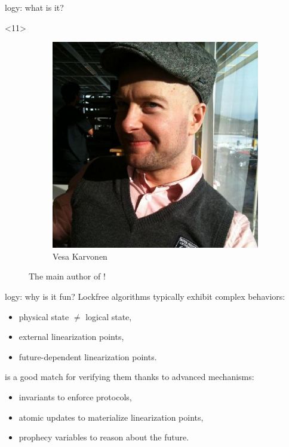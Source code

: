\begin{frame}[fragile]{\Zoo[]logy: what is it?}
\begin{overbox}<11>
    \begin{figure}
        \begin{subfigure}{0.4\textwidth}
            \includegraphics[scale=0.2]{images/vesa_karvonen.jpg}
            \caption*{\footnotesize Vesa Karvonen}
        \end{subfigure}
        \caption*{The main author of \Kcas!}
    \end{figure}
\end{overbox}


\end{frame}


\begin{frame}{\Zoo[]logy: why is it fun?}
Lockfree algorithms typically exhibit complex behaviors:
\begin{itemize}
    \item physical state $\neq$ logical state,
    \item external linearization points,
    \item future-dependent linearization points.
\end{itemize}
\vfill
\Iris is a good match for verifying them thanks to advanced mechanisms:
\begin{itemize}
    \item invariants to enforce protocols,
    \item atomic updates to materialize linearization points,
    \item prophecy variables to reason about the future.
\end{itemize}
\end{frame}
